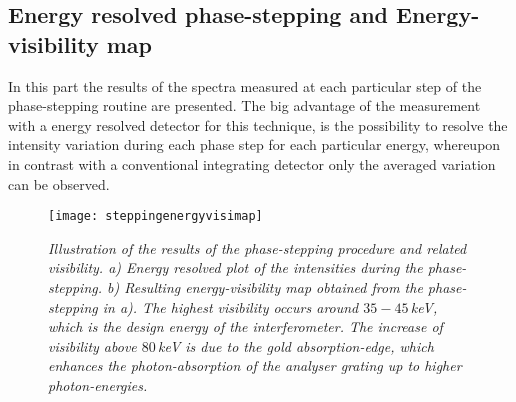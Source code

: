 \subsection{Energy resolved phase-stepping and Energy-visibility map}\label{subsec:ephasestep}
In this part the results of the spectra measured at each particular step of the phase-stepping routine are presented. The big advantage of the measurement with a energy resolved detector for this technique, is the possibility to resolve the intensity variation during each phase step for each particular energy, whereupon in contrast with a conventional integrating detector only the averaged variation can be observed. 
\begin{figure}%
	\begin{center}
		\texttt{[image: steppingenergyvisimap]}
	\end{center}
	\caption[Energy resolved stepping and energy-visibility map]{\textit{Illustration of the results of the phase-stepping procedure and related visibility. a) Energy resolved plot of the intensities during the phase-stepping. b) Resulting energy-visibility map obtained from the phase-stepping in a). The highest visibility occurs around $35-45\,$keV, which is the design energy of the interferometer. The increase of visibility above $80\,$keV is due to the gold absorption-edge, which enhances the photon-absorption of the analyser grating up to higher photon-energies.}}
	\label{stepvisi}
\end{figure}
